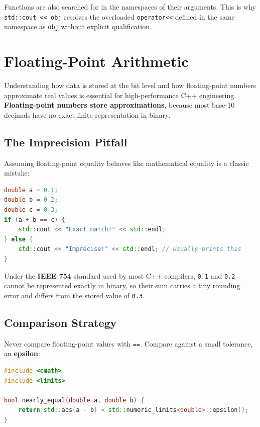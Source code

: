 Functions are also searched for in the namespaces of their arguments. This is why \texttt{std::cout << obj} resolves the overloaded \texttt{operator<<} defined in the same namespace as \texttt{obj} without explicit qualification.

\section{Floating-Point Arithmetic}
\label{sec:floating-point}

Understanding how data is stored at the bit level and how floating-point numbers approximate real values is essential for high-performance C++ engineering. \textbf{Floating-point numbers store approximations}, because most base-10 decimals have no exact finite representation in binary.

\subsection{The Imprecision Pitfall}

Assuming floating-point equality behaves like mathematical equality is a classic mistake:

\begin{lstlisting}[language=C++, caption={Floating-point equality is treacherous}]
double a = 0.1;
double b = 0.2;
double c = 0.3;
if (a + b == c) {
    std::cout << "Exact match!" << std::endl;
} else {
    std::cout << "Imprecise!" << std::endl; // Usually prints this
}
\end{lstlisting}

Under the \textbf{IEEE 754} standard used by most C++ compilers, \texttt{0.1} and \texttt{0.2} cannot be represented exactly in binary, so their sum carries a tiny rounding error and differs from the stored value of \texttt{0.3}.

\subsection{Comparison Strategy}

Never compare floating-point values with \texttt{==}. Compare against a small tolerance, an \textbf{epsilon}:

\begin{lstlisting}[language=C++, caption={Tolerance-based floating-point comparison}]
#include <cmath>
#include <limits>

bool nearly_equal(double a, double b) {
    return std::abs(a - b) < std::numeric_limits<double>::epsilon();
}
\end{lstlisting}

